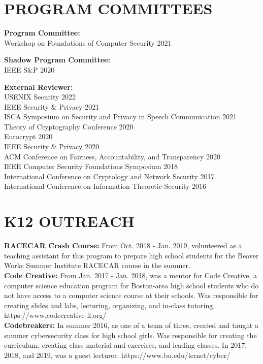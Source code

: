 \documentclass{res}
\begin{document}
\begin{resume}
\section{PROGRAM COMMITTEES}
\vspace{0.1in}

\textbf{Program Committee:} \\
Workshop on Foundations of Computer Security 2021

\textbf{Shadow Program Committee:} \\
IEEE S\&P 2020

\textbf{External Reviewer:} \\
USENIX Security 2022 \\
IEEE Security \& Privacy 2021 \\
ISCA Symposium on Security and Privacy in Speech Communication 2021 \\
Theory of Cryptography Conference 2020 \\
Eurocrypt 2020 \\
IEEE Security \& Privacy 2020 \\
ACM Conference on Fairness, Accountability, and Transparency 2020 \\
IEEE Computer Security Foundations Symposium 2018 \\
International Conference on Cryptology and Network Security 2017 \\
International Conference on Information Theoretic Security 2016

\vspace{0.25in}


\section{K12 OUTREACH}
\vspace{0.1in}

\textbf{RACECAR Crash Course:} From Oct. 2018 - Jan. 2019, volunteered as a teaching assistant for
this program to prepare high school students for the Beaver Works Summer Institute RACECAR course in the summer. \\
\textbf{Code Creative:} From Jan. 2017 - Jan. 2018, was a mentor for Code Creative, a computer science education
program for Boston-area high school students who do not have access to a computer science course at their schools.
Was responsible for creating slides and labs, lecturing, organizing, and in-class tutoring.
https://www.codecreative-ll.org/ \\
\textbf{Codebreakers:} In summer 2016, as one of a team of three, created and taught a summer cybersecurity class for
high school girls.  Was responsible for creating the curriculum, creating class material and exercises, and leading
classes.  In 2017, 2018, and 2019, was a guest lecturer.  https://www.bu.edu/lernet/cyber/ \\



\end{resume}
\end{document}
